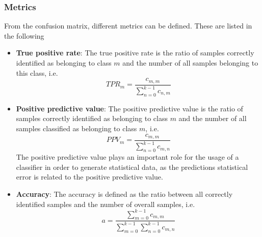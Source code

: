 \subsubsection{Metrics}

From the confusion matrix, different metrics can be defined. These are listed in the following
\begin{itemize}[label={}]
\item \textbf{True positive rate}: The true positive rate is the ratio of samples correctly identified as belonging to class $m$ and the number of all samples belonging to this class, i.e.
\begin{equation}
TPR_m = \frac{c_{m,m}}{\sum_{n=0}^{k-1} c_{n,m}}
\end{equation}
\item \textbf{Positive predictive value}: The positive predictive value is the ratio of samples correctly identified as belonging to class $m$ and the number of all samples classified as belonging to class $m$, i.e. 
\begin{equation}
PPV_m = \frac{c_{m,m}}{\sum_{n=0}^{k-1} c_{m,n}}
\end{equation} 
The positive predictive value plays an important role for the usage of a classifier in order to generate statistical data, as the predictions statistical error is related to the positive predictive value.
\item \textbf{Accuracy}: The accuracy is defined as the ratio between all correctly identified samples and the number of overall samples, i.e.
%
\begin{equation}
a = \frac{\sum_{m=0}^{k-1} c_{m,m}}{\sum_{m=0}^{k-1} \sum_{n=0}^{k-1} c_{m,n}}
\end{equation} 

\end{itemize}




